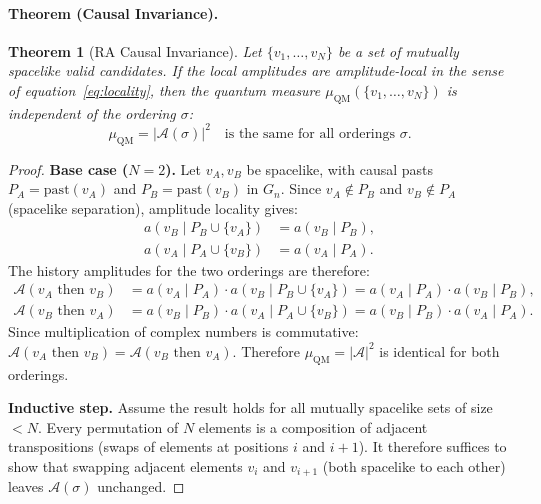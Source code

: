 \documentclass[11pt,a4paper]{article}
\theoremstyle{plain}
\newtheorem{theorem}{Theorem}[section]
\theoremstyle{definition}
\theoremstyle{remark}
\newcommand{\muC}{\mu_{\mathrm{QM}}}   %
\begin{document}
\begin{description}
  \paragraph{Theorem (Causal Invariance).}
  \begin{theorem}[RA Causal Invariance]
  \label{thm:causal_invariance}
  Let $\{v_1, \ldots, v_N\}$ be a set of mutually spacelike valid candidates.
  If the local amplitudes are amplitude-local in the sense of
  equation~\eqref{eq:locality}, then the quantum measure
  $\muC(\{v_1,\ldots,v_N\})$ is independent of the ordering $\sigma$:
  \begin{equation}
    \muC = \bigl|\mathcal{A}(\sigma)\bigr|^2
    \quad\text{is the same for all orderings } \sigma.
    \label{eq:ci_theorem}
  \end{equation}
  \end{theorem}

  \begin{proof}
  \textbf{Base case ($N=2$).} Let $v_A, v_B$ be spacelike, with causal pasts
  $P_A = \mathrm{past}(v_A)$ and $P_B = \mathrm{past}(v_B)$ in $G_n$. Since
  $v_A \notin P_B$ and $v_B \notin P_A$ (spacelike separation), amplitude
  locality gives:
  \begin{align}
    a(v_B \mid P_B \cup \{v_A\}) &= a(v_B \mid P_B), \label{eq:loc_B}\\
    a(v_A \mid P_A \cup \{v_B\}) &= a(v_A \mid P_A). \label{eq:loc_A}
  \end{align}
  The history amplitudes for the two orderings are therefore:
  \begin{align}
    \mathcal{A}(v_A \text{ then } v_B)
      &= a(v_A \mid P_A) \cdot a(v_B \mid P_B \cup \{v_A\})
       = a(v_A \mid P_A) \cdot a(v_B \mid P_B), \\
    \mathcal{A}(v_B \text{ then } v_A)
      &= a(v_B \mid P_B) \cdot a(v_A \mid P_A \cup \{v_B\})
       = a(v_B \mid P_B) \cdot a(v_A \mid P_A).
  \end{align}
  Since multiplication of complex numbers is commutative:
  $\mathcal{A}(v_A \text{ then } v_B) = \mathcal{A}(v_B \text{ then } v_A)$.
  Therefore $\muC = |\mathcal{A}|^2$ is identical for both orderings.

  \textbf{Inductive step.} Assume the result holds for all mutually spacelike
  sets of size $< N$. Every permutation of $N$ elements is a composition of
  adjacent transpositions (swaps of elements at positions $i$ and $i+1$). It
  therefore suffices to show that swapping adjacent elements $v_i$ and $v_{i+1}$
  (both spacelike to each other) leaves $\mathcal{A}(\sigma)$ unchanged.


\end{proof}
\end{description}
\end{document}
